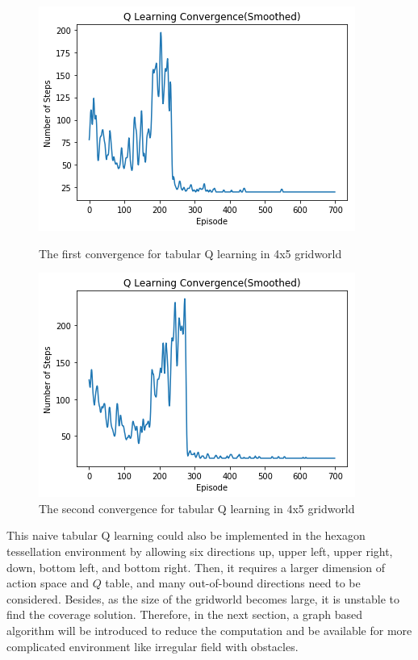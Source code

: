 \documentclass{article}
\begin{document}
\begin{figure}[H]
   \begin{minipage}{0.48\textwidth}
     \centering
     \includegraphics[width=.99\linewidth]{4.png}
     \caption{The first convergence for tabular Q learning in 4x5 gridworld}\label{Fig:Data1}
   \end{minipage}\hfill
   \begin{minipage}{0.48\textwidth}
     \centering
     \includegraphics[width=.99\linewidth]{6.png}
     \caption{The second convergence for tabular Q learning in 4x5 gridworld}\label{Fig:Data2}
   \end{minipage}
\end{figure}

This naive tabular Q learning could also be implemented in the hexagon tessellation environment by allowing six directions up, upper left, upper right, down, bottom left, and bottom right. Then, it requires a larger dimension of action space and $Q$ table, and many out-of-bound directions need to be considered. Besides, as the size of the gridworld becomes large, it is unstable to find the coverage solution. Therefore, in the next section, a graph based algorithm will be introduced to reduce the computation and be available for more complicated environment like irregular field with obstacles.
\end{document}
